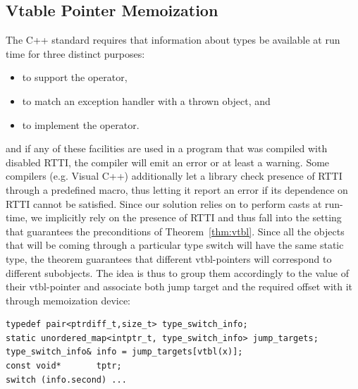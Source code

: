 \subsection{Vtable Pointer Memoization}
\label{sec:vtblmem}


The C++ standard requires that information about types be available at run time 
for three distinct purposes:

\begin{itemize}
\setlength{\itemsep}{0pt}
\setlength{\parskip}{0pt}
\item to support the  operator,
\item to match an exception handler with a thrown object, and
\item to implement the  operator.
\end{itemize}

\noindent
and if any of these facilities are used in a program that was compiled with 
disabled RTTI, the compiler will emit an error or at least a warning. Some 
compilers (e.g. Visual C++) additionally let a library check presence of RTTI 
through a predefined macro, thus letting it report an error if its dependence on 
RTTI cannot be satisfied. Since our solution relies on  to 
perform casts at run-time, we implicitly rely on the presence of RTTI and thus 
fall into the setting that guarantees the preconditions of Theorem~\ref{thm:vtbl}.
Since all the objects that will be coming through a particular type switch will 
have the same static type, the theorem guarantees that different vtbl-pointers 
will correspond to different subobjects. The idea is thus to group them 
accordingly to the value of their vtbl-pointer and associate both jump target 
and the required offset with it through memoization device:

\begin{lstlisting}
typedef pair<ptrdiff_t,size_t> type_switch_info;
static unordered_map<intptr_t, type_switch_info> jump_targets;
type_switch_info& info = jump_targets[vtbl(x)];
const void*       tptr; 
switch (info.second) ...
\end{lstlisting}

